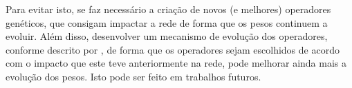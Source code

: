 \documentclass[12pt]{article}
\begin{document}
Para evitar isto, se faz necessário a criação de novos (e melhores) operadores genéticos, que consigam impactar a rede de forma que os pesos continuem a evoluir. Além disso, desenvolver um mecanismo de evolução dos operadores, conforme descrito por \cite{montana}, de forma que os operadores sejam escolhidos de acordo com o impacto que este teve anteriormente na rede, pode melhorar ainda mais a evolução dos pesos. Isto pode ser feito em trabalhos futuros.






\end{document}
